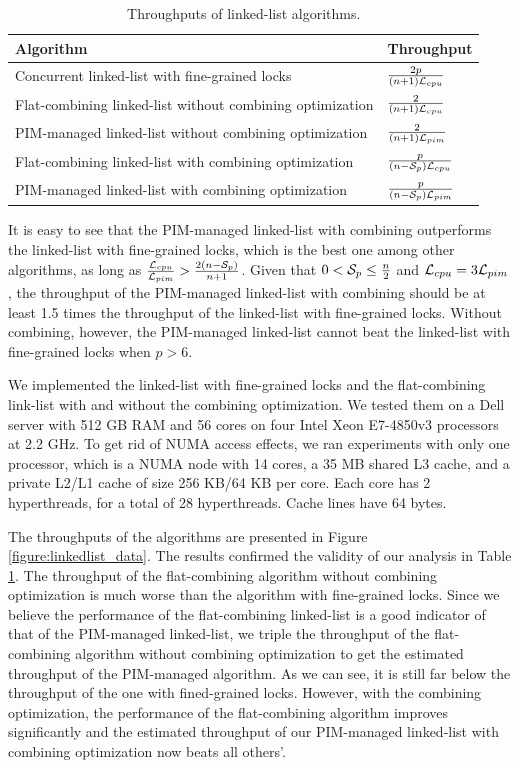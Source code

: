 \begin{table}[ht!]
\begin{center}
    \begin{tabular}{| l | l |}
    \hline
    Algorithm & Throughput\\ \hline
    Concurrent linked-list with fine-grained locks & ${2p \over (n+1)\mathcal{L}_{cpu}}$ \\ \hline
    Flat-combining linked-list without combining optimization & ${2 \over (n+1)\mathcal{L}_{cpu}}$ \\ \hline
    PIM-managed linked-list without combining optimization & ${2 \over (n+1)\mathcal{L}_{pim}}$ \\ \hline
    Flat-combining linked-list with combining optimization & ${p \over (n-\mathcal{S}_{p})\mathcal{L}_{cpu}}$ \\ \hline
    PIM-managed linked-list with combining optimization & ${p \over (n-\mathcal{S}_{p})\mathcal{L}_{pim}}$ \\ \hline
    \end{tabular}
\end{center}
\caption{Throughputs of linked-list algorithms.}
\label{tab:linkedlist}
\end{table}

It is easy to see that the PIM-managed linked-list with combining outperforms 
the linked-list with fine-grained locks, which is the best one among other algorithms, 
as long as ${\mathcal{L}_{cpu} \over \mathcal{L}_{pim}} > {2(n - \mathcal{S}_{p})\over n + 1}$.
Given that $0 < \mathcal{S}_{p} \le {n \over 2}$ and $\mathcal{L}_{cpu} = 3\mathcal{L}_{pim}$,
the throughput of the PIM-managed linked-list with combining should be at least 
1.5 times the throughput of the linked-list with fine-grained locks.
Without combining, however, the PIM-managed linked-list cannot
beat the linked-list with fine-grained locks when $p > 6$.

We implemented the linked-list with fine-grained locks and the flat-combining link-list 
with and without the combining optimization.
We tested them on a Dell server with 512 GB RAM and 
56 cores on four Intel Xeon E7-4850v3 processors at 2.2 GHz.
To get rid of NUMA access effects, we ran experiments with only one processor, 
which is a NUMA node with 14 cores, a 35 MB shared L3 cache, 
and a private L2/L1 cache of size 256 KB/64 KB per core. 
Each core has 2 hyperthreads, for a total of 28 hyperthreads. 
Cache lines have 64 bytes.

The throughputs of the algorithms are presented in Figure \ref{figure:linkedlist_data}.
The results confirmed the validity of our analysis in Table \ref{tab:linkedlist}.
The throughput of the flat-combining algorithm without combining optimization
is much worse than the algorithm with fine-grained locks.
Since we believe the performance of the flat-combining linked-list is a good 
indicator of that of the PIM-managed linked-list, we triple the throughput of the
flat-combining algorithm without combining optimization to get the estimated
throughput of the PIM-managed algorithm. 
As we can see, it is still far below the throughput of the one with fined-grained locks.
However, with the combining optimization, the performance of the flat-combining
algorithm improves significantly and the estimated throughput of our PIM-managed
linked-list with combining optimization now beats all others'.

